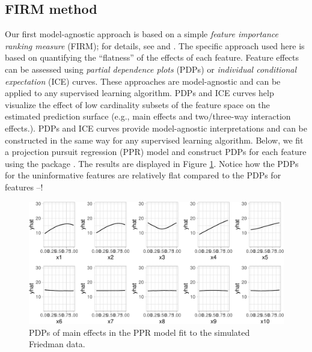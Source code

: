 \subsection{FIRM method}

Our first model-agnostic approach is based on a simple \emph{feature
importance ranking measure} (FIRM); for details, see
\citet{greenwell-simple-2018} and \citet{firm}. The specific approach
used here is based on quantifying the ``flatness'' of the effects of
each feature. Feature effects can be assessed using \emph{partial
dependence plots} (PDPs) or \emph{individual conditional expectation}
(ICE) curves. These approaches are model-agnostic and can be applied to
any supervised learning algorithm. PDPs and ICE curves help visualize
the effect of low cardinality subsets of the feature space on the
estimated prediction surface (e.g., main effects and two/three-way
interaction effects.). PDPs and ICE curves provide model-agnostic
interpretations and can be constructed in the same way for any
supervised learning algorithm. Below, we fit a projection pursuit
regression (PPR) model and construct PDPs for each feature using the
 package \citet{greenwell-pdp-2017}. The results are
displayed in Figure \ref{fig:pdp-ppr}. Notice how the PDPs for the
uninformative features are relatively flat compared to the PDPs for
features --!

\begin{Schunk}
\begin{figure}[!htb]

{\centering \includegraphics[width=1\linewidth]{greenwell-boehmke_files/figure-latex/pdp-ppr-1} 

}

\caption[PDPs of main effects in the PPR model fit to the simulated Friedman data]{PDPs of main effects in the PPR model fit to the simulated Friedman data.}\label{fig:pdp-ppr}
\end{figure}
\end{Schunk}

